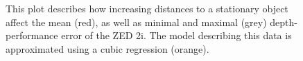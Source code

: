 \begin{figure}[h]
\begin{center}
		\caption{
			This plot describes how increasing distances to a stationary object affect the mean (red), as well as minimal and maximal (grey) depth-performance error of the ZED 2i. The model describing this data is approximated using a cubic regression (orange).
		}
		\label{plot:zed2Benchmark}
	\end{center}
\end{figure}
